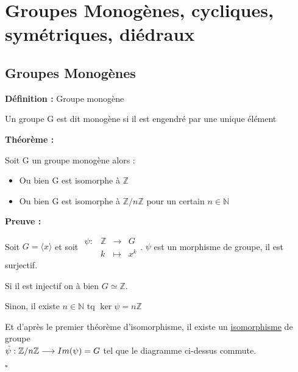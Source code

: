 \documentclass{report}
\renewenvironment{leftbar}{%
  \def\FrameCommand{\vrule width 0.4pt \hspace{10pt}}%
  \MakeFramed {\advance\hsize-\width \FrameRestore}}%
 {\endMakeFramed}%
\newenvironment{definition}[1][]{
    \begin{tcolorbox}[colframe= white]
    \textbf{Définition :} 
    #1 \par
    }
    {\end{tcolorbox}}
\newenvironment{preuve}{\vspace*{0.5cm}
    \begin{leftbar}
    \noindent\textbf{Preuve :}\par}{
    \begin{flushright}
    $\square$
    \end{flushright}
    \end{leftbar}
}
\newenvironment{theoreme}[1][]{
    \begin{tcolorbox}[]
    \textbf{Théorème :} #1  \par} 
    {\end{tcolorbox}}
\newcommand{\fonction}[5]{
    \begin{array}{l|rcl}
    #1: & #2 & \longrightarrow & #3 \\
        & #4 & \longmapsto & #5 
    \end{array}
}
\newcommand{\N}{\mathbb{N}}
\newcommand{\Z}{\mathbb{Z}}
\newcommand{\dsp}{\displaystyle}
\begin{document}
\section{Groupes Monogènes, cycliques, symétriques, diédraux}

\subsection{Groupes Monogènes}

\begin{definition}[Groupe monogène]
Un groupe G est dit monogène si il est engendré par une unique élément
\end{definition}

\begin{theoreme}
Soit G un groupe monogène alors : \par
\begin{itemize}
\item Ou bien G est isomorphe à $\Z$
\item Ou bien G est isomorphe à $\Z / n\Z$ pour un certain $n \in \N$
\end{itemize}
\end{theoreme}

\begin{preuve}

\noindent Soit $G = \langle x \rangle$ et soit $\fonction{\psi}{\Z}{G}{k}{x^{k}}$. $\psi$ est un morphisme de groupe, il est surjectif. \par
\quad Si il est injectif on à bien $G\simeq \Z$. \par
Sinon, il existe $n\in \N$ tq $\ker \psi = n\Z$  \par

\begin{center}
\end{center}
Et d'après le premier théorème d'isomorphisme, il existe un \underline{isomorphisme} de groupe\\$\dsp\Tilde{\psi} : \Z/n\Z \longrightarrow Im(\psi)=G$ tel que le diagramme ci-dessus  commute.



\end{preuve}
\end{document}
